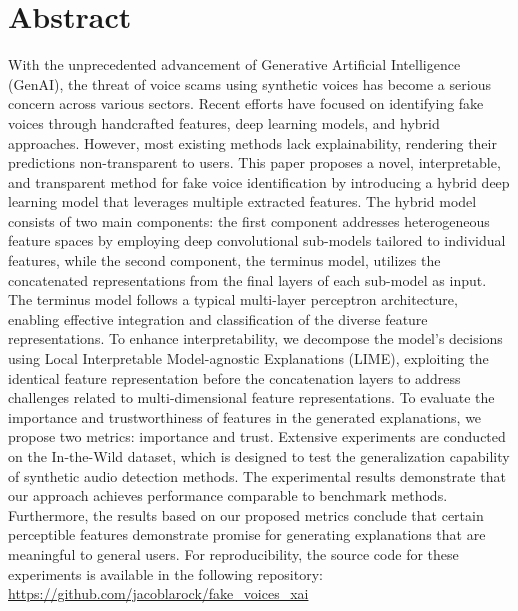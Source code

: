 \documentclass{article}
\begin{document}
    \section{Abstract}
	\sloppy
	With the unprecedented advancement of Generative Artificial Intelligence (GenAI), the threat
	of voice scams using synthetic voices has become a serious concern across various sectors.
	Recent efforts have focused on identifying fake voices through handcrafted features, deep
	learning models, and hybrid approaches. However, most existing methods lack explainability,
	rendering their predictions non-transparent to users. This paper proposes a novel,
	interpretable, and transparent method for fake voice identification by introducing a hybrid
	deep learning model that leverages multiple extracted features. The hybrid model consists of
	two main components: the first component addresses heterogeneous feature spaces by employing
	deep convolutional sub-models tailored to individual features, while the second component, the
	terminus model, utilizes the concatenated representations from the final layers of each
	sub-model as input. The terminus model follows a typical multi-layer perceptron architecture,
	enabling effective integration and classification of the diverse feature representations. To
	enhance interpretability, we decompose the model’s decisions using Local Interpretable
	Model-agnostic Explanations (LIME), exploiting the identical feature representation before the
	concatenation layers to address challenges related to multi-dimensional feature
	representations. To evaluate the importance and trustworthiness of features in the generated
	explanations, we propose two metrics: importance and trust. Extensive experiments are
	conducted on the In-the-Wild dataset, which is designed to test the generalization capability
	of synthetic audio detection methods. The experimental results demonstrate that our approach
	achieves performance comparable to benchmark methods. Furthermore, the results based on our
	proposed metrics conclude that certain perceptible features demonstrate promise for generating
	explanations that are meaningful to general users. For reproducibility, the source code for
	these experiments is available in the following repository:
	\url{https://github.com/jacoblarock/fake_voices_xai}
\end{document}

